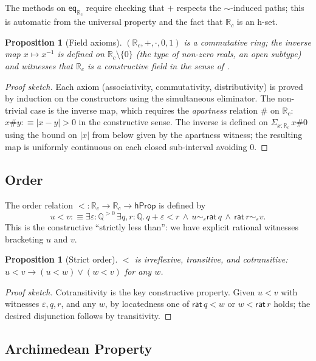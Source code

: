 \documentclass[12pt]{article}
\newtheorem{proposition}[theorem]{Proposition}
\theoremstyle{definition}
\theoremstyle{remark}
\newcommand{\Q}{\mathbb{Q}}
\newcommand{\Rc}{\mathbb{R}_{c}}
\newcommand{\rat}{\mathsf{rat}}
\newcommand{\close}{\mathrel{\sim}}
\begin{document}
The methods on $\mathsf{eq}_{\Rc}$ require checking that
$+$ respects the $\close$-induced paths; this is automatic from
the universal property and the fact that $\Rc$ is an h-set.

\begin{proposition}[Field axioms]
\label{prop:field}
$(\Rc, +, \cdot, 0, 1)$ is a commutative ring; the inverse map
$x \mapsto x^{-1}$ is defined on $\Rc \setminus \{0\}$ (the type of
non-zero reals, an open subtype) and witnesses that $\Rc$ is a
constructive field in the sense of \cite{BridgesRichman}.
\end{proposition}
\begin{proof}[Proof sketch]
Each axiom (associativity, commutativity, distributivity) is proved by
induction on the constructors using the simultaneous eliminator. The
non-trivial case is the inverse map, which requires the
\emph{apartness} relation $\#$ on $\Rc$: $x \# y :\equiv |x - y| > 0$
in the constructive sense. The inverse is defined on $\Sigma_{x : \Rc}\,
x \# 0$ using the bound on $|x|$ from below given by the apartness
witness; the resulting map is uniformly continuous on each closed
sub-interval avoiding $0$.
\end{proof}

\subsection{Order}

The order relation $< : \Rc \to \Rc \to \mathsf{hProp}$ is defined by
\[
u < v :\equiv \exists \varepsilon : \Q^{>0}\,\exists q, r : \Q.\,
   q + \varepsilon < r \,\wedge\, u \close_\varepsilon \rat\,q
   \,\wedge\, \rat\,r \close_\varepsilon v.
\]
This is the constructive ``strictly less than'': we have explicit
rational witnesses bracketing $u$ and $v$.

\begin{proposition}[Strict order]
\label{prop:strict-order}
$<$ is irreflexive, transitive, and \emph{cotransitive}:
$u < v \to (u < w) \vee (w < v)$ for any $w$.
\end{proposition}
\begin{proof}[Proof sketch]
Cotransitivity is the key constructive property. Given $u < v$ with
witnesses $\varepsilon, q, r$, and any $w$, by locatedness one of
$\rat\,q < w$ or $w < \rat\,r$ holds; the desired disjunction follows
by transitivity.
\end{proof}

\subsection{Archimedean Property}
\end{document}
